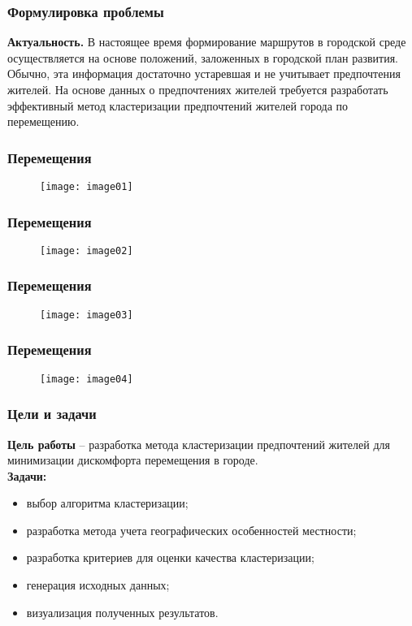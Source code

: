 \begin{frame}
    \frametitle{Формулировка проблемы}
    \textbf{Актуальность.} В настоящее время формирование маршрутов в городской
    среде осуществляется на основе положений, заложенных в городской план
    развития. Обычно, эта информация достаточно устаревшая и не учитывает
    предпочтения жителей. На основе данных о предпочтениях жителей требуется
    разработать эффективный метод кластеризации предпочтений жителей города
    по перемещению.
\end{frame}

\begin{frame}
    \frametitle{Перемещения}
    \begin{figure}
        \center
        \texttt{[image: image01]}
    \end{figure}
\end{frame}

\begin{frame}
    \frametitle{Перемещения}
    \begin{figure}
        \center
        \texttt{[image: image02]}
    \end{figure}
\end{frame}

\begin{frame}
    \frametitle{Перемещения}
    \begin{figure}
        \center
        \texttt{[image: image03]}
    \end{figure}
\end{frame}

\begin{frame}
    \frametitle{Перемещения}
    \begin{figure}
        \center
        \texttt{[image: image04]}
    \end{figure}
\end{frame}

\begin{frame}
    \frametitle{Цели и задачи}
    \textbf{Цель работы} -- разработка метода кластеризации предпочтений
    жителей для минимизации дискомфорта перемещения в городе.\\
    \textbf{Задачи:}
    \begin{itemize}
        \item выбор алгоритма кластеризации;
        \item разработка метода учета географических особенностей местности;
        \item разработка критериев для оценки качества кластеризации;
        \item генерация исходных данных;
        \item визуализация полученных результатов.
    \end{itemize}
\end{frame}

